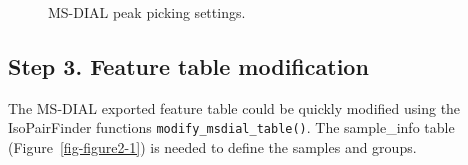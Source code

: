 \documentclass[
  letterpaper,
  DIV=11,
  numbers=noendperiod]{scrreprt}
\begin{document}
\begin{figure}


\caption{\label{fig-figure2-4}MS-DIAL peak picking settings.}

\end{figure}%

\subsection{Step 3. Feature table
modification}\label{step-3.-feature-table-modification-1}

The MS-DIAL exported feature table could be quickly modified using the
IsoPairFinder functions \texttt{modify\_msdial\_table()}. The
sample\_info table (Figure~\ref{fig-figure2-1}) is needed to define the
samples and groups.
\end{document}
